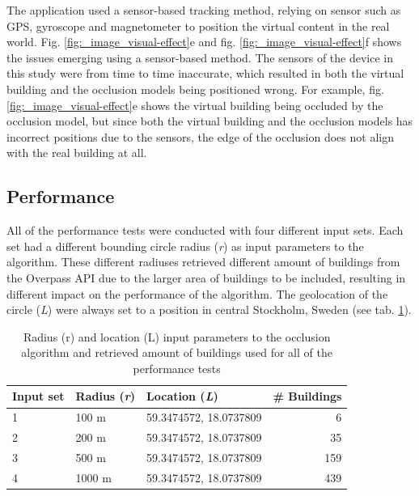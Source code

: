 The application used a sensor-based tracking method, relying on sensor such as GPS, gyroscope and magnetometer to position the virtual content in the real world. Fig. \ref{fig:_image_visual-effect}e and fig. \ref{fig:_image_visual-effect}f shows the issues emerging using a sensor-based method. The sensors of the device in this study were from time to time inaccurate, which resulted in both the virtual building and the occlusion models being positioned wrong. For example, fig. \ref{fig:_image_visual-effect}e shows the virtual building being occluded by the occlusion model, but since both the virtual building and the occlusion models has incorrect positions due to the sensors, the edge of the occlusion does not align with the real building at all.

\subsection{Performance}
All of the performance tests were conducted with four different input sets. Each set had a different bounding circle radius (\textit{r}) as input parameters to the algorithm. These different radiuses retrieved different amount of buildings from the Overpass API due to the larger area of buildings to be included, resulting in different impact on the performance of the algorithm. The geolocation of the circle (\textit{L}) were always set to a position in central Stockholm, Sweden (see tab. \ref{tab:input_sets}).

\begin{table}
  \caption{Radius (r) and location (L) input parameters to the occlusion algorithm and retrieved amount of buildings used for all of the performance tests}
  \label{tab:input_sets}
  \begin{tabular}{lllr}
    \toprule
    Input set & Radius (\textit{r}) & Location (\textit{L}) & \# Buildings\\
    \midrule
    1 & 100 m & 59.3474572, 18.0737809 & 6\\
    2 & 200 m & 59.3474572, 18.0737809 & 35\\
    3 & 500 m & 59.3474572, 18.0737809 & 159\\
    4 & 1000 m & 59.3474572, 18.0737809 & 439\\
    \bottomrule
  \end{tabular}
\end{table}

